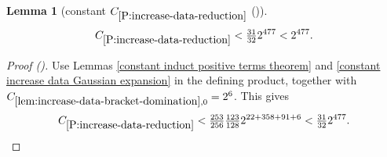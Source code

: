 \documentclass[12pt,reqno]{amsart}
\newcommand{\auto}{{({\tiny\faCar})}}
\theoremstyle{plain}
\newtheorem{lemma}[theorem]{Lemma}
\numberwithin{equation}{section}
\theoremstyle{remark}
\newcommand{\uses}[1]{}
\newcommand{\usesdefs}[1]{}
\begin{document}
\begin{lemma}[constant $C_{\ref{P:increase-data-reduction}}$ \auto]\label{constant increase data reduction}\uses{constant induct positive terms theorem,constant increase data Gaussian expansion,lem:increase-data-bracket-domination,P:increase-data-reduction}\usesdefs{}
\begin{equation}\label{constant increase data reduction bound}
C_{\ref{P:increase-data-reduction}}
<\tfrac{31}{32}2^{477}<2^{477}.
\end{equation}
\end{lemma}
\begin{proof}[Proof \auto]
Use Lemmas \ref{constant induct positive terms theorem} and \ref{constant increase data Gaussian expansion} in the defining product, together with $C_{\ref{lem:increase-data-bracket-domination},0}=2^6$. This gives
\[
C_{\ref{P:increase-data-reduction}}
<\tfrac{253}{256}\tfrac{123}{128}2^{22+358+91+6}
<\tfrac{31}{32}2^{477}.
\]
\end{proof}
\end{document}
